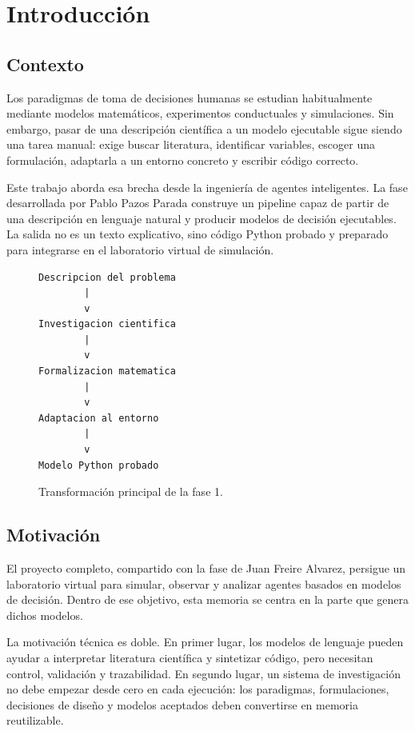 \chapter{Introducción}

\section{Contexto}

Los paradigmas de toma de decisiones humanas se estudian habitualmente mediante
modelos matemáticos, experimentos conductuales y simulaciones. Sin embargo,
pasar de una descripción científica a un modelo ejecutable sigue siendo una
tarea manual: exige buscar literatura, identificar variables, escoger una
formulación, adaptarla a un entorno concreto y escribir código correcto.

Este trabajo aborda esa brecha desde la ingeniería de agentes inteligentes. La
fase desarrollada por Pablo Pazos Parada construye un pipeline capaz de partir
de una descripción en lenguaje natural y producir modelos de decisión
ejecutables. La salida no es un texto explicativo, sino código Python probado y
preparado para integrarse en el laboratorio virtual de simulación.

\begin{figure}[H]
\centering
\begin{verbatim}
Descripcion del problema
        |
        v
Investigacion cientifica
        |
        v
Formalizacion matematica
        |
        v
Adaptacion al entorno
        |
        v
Modelo Python probado
\end{verbatim}
\caption{Transformación principal de la fase 1.}
\end{figure}

\section{Motivación}

El proyecto completo, compartido con la fase de Juan Freire Alvarez, persigue un
laboratorio virtual para simular, observar y analizar agentes basados en modelos
de decisión. Dentro de ese objetivo, esta memoria se centra en la parte que
genera dichos modelos.

La motivación técnica es doble. En primer lugar, los modelos de lenguaje pueden
ayudar a interpretar literatura científica y sintetizar código, pero necesitan
control, validación y trazabilidad. En segundo lugar, un sistema de investigación
no debe empezar desde cero en cada ejecución: los paradigmas, formulaciones,
decisiones de diseño y modelos aceptados deben convertirse en memoria reutilizable.

